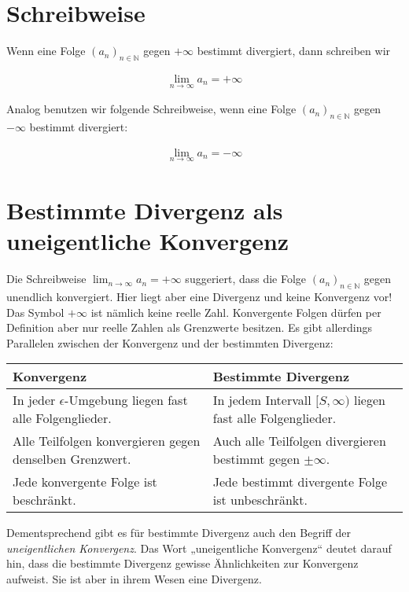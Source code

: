 \documentclass[fontsize=9pt,
               parskip=half-,
               DIV=14,
               listof=chapterentry,
               tocflat]{scrbook}
\begin{document}
\section{Schreibweise}

Wenn eine Folge $(a_{n})_{n\in \mathbb {N} }$ gegen $+\infty $ bestimmt divergiert, dann schreiben wir

\begin{align*}
\lim _{n\to \infty }a_{n}=+\infty 
\end{align*}

Analog benutzen wir folgende Schreibweise, wenn eine Folge $(a_{n})_{n\in \mathbb {N} }$ gegen $-\infty $ bestimmt divergiert:

\begin{align*}
\lim _{n\to \infty }a_{n}=-\infty 
\end{align*}

\section{Bestimmte Divergenz als uneigentliche Konvergenz}

Die Schreibweise $\lim _{n\to \infty }a_{n}=+\infty $ suggeriert, dass die Folge $(a_{n})_{n\in \mathbb {N} }$ gegen unendlich konvergiert. Hier liegt aber eine Divergenz und keine Konvergenz vor! Das Symbol $+\infty $ ist nämlich keine reelle Zahl. Konvergente Folgen dürfen per Definition aber nur reelle Zahlen als Grenzwerte besitzen. Es gibt allerdings Parallelen zwischen der Konvergenz und der bestimmten Divergenz:


\renewcommand{\arraystretch}{1.5}

\begin{longtabu} to \linewidth {X[l]X[l]} \\ \toprule 
Konvergenz & Bestimmte Divergenz \\ 
\midrule
In jeder $\epsilon $-Umgebung liegen fast alle Folgenglieder. & In jedem Intervall $[S,\infty )$ liegen fast alle Folgenglieder. \\ 
Alle Teilfolgen konvergieren gegen denselben Grenzwert. & Auch alle Teilfolgen divergieren bestimmt gegen $\pm \infty $. \\ 
Jede konvergente Folge ist beschränkt. & Jede bestimmt divergente Folge ist unbeschränkt. \\ 
\bottomrule
\end{longtabu}
\renewcommand{\arraystretch}{1.0}
Dementsprechend gibt es für bestimmte Divergenz auch den Begriff der \emph{uneigentlichen Konvergenz}. Das Wort „uneigentliche Konvergenz“ deutet darauf hin, dass die bestimmte Divergenz gewisse Ähnlichkeiten zur Konvergenz aufweist. Sie ist aber in ihrem Wesen eine Divergenz.
\end{document}
